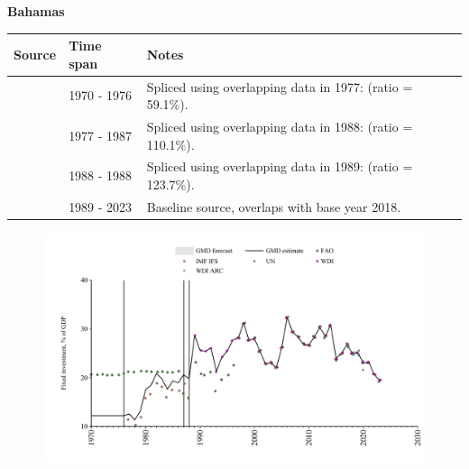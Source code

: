 \documentclass[12pt,a4paper,landscape]{article}
\begin{document}
\begin{adjustbox}{max totalsize={\paperwidth}{\paperheight},center}
\begin{minipage}[t][\textheight][t]{\textwidth}
\vspace*{0.5cm}
{}
\begin{center}
{\Large\bfseries Bahamas}
\end{center}
\vspace{0.5cm}
\begin{table}[H]
\centering
\small
\begin{tabular}{|l|l|l|}
\hline
\textbf{Source} & \textbf{Time span} & \textbf{Notes} \\
\hline
\rowcolor{white}\cite{UN}& 1970 - 1976 &Spliced using overlapping data in 1977: (ratio = 59.1\%).\\
\rowcolor{lightgray}\cite{WDI}& 1977 - 1987 &Spliced using overlapping data in 1988: (ratio = 110.1\%).\\
\rowcolor{white}\cite{UN}& 1988 - 1988 &Spliced using overlapping data in 1989: (ratio = 123.7\%).\\
\rowcolor{lightgray}\cite{WDI}& 1989 - 2023 &Baseline source, overlaps with base year 2018.\\
\hline
\end{tabular}
\end{table}
\begin{figure}[H]
\centering
\includegraphics[width=\textwidth,height=0.6\textheight,keepaspectratio]{graphs/BHS_finv_GDP.pdf}
\end{figure}
\end{minipage}
\end{adjustbox}
\end{document}

